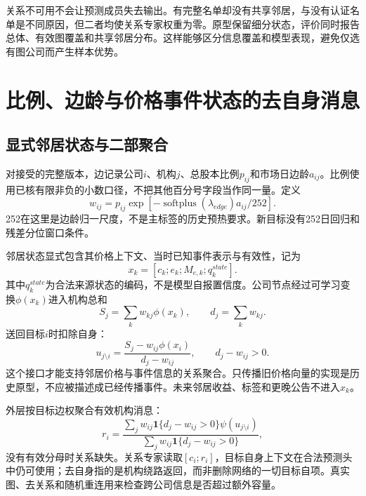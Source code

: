 关系不可用不会让预测成员失去输出。有完整名单却没有共享邻居，与没有认证名单是不同原因，但二者均使关系专家权重为零。原型保留细分状态，评价同时报告总体、有效图覆盖和共享邻居分布。这样能够区分信息覆盖和模型表现，避免仅选有图公司而产生样本优势。

\section{比例、边龄与价格事件状态的去自身消息}
\subsection{显式邻居状态与二部聚合}
对接受的完整版本，边记录公司$i$、机构$j$、总股本比例$p_{ij}$和市场日边龄$a_{ij}$。比例使用已核有限非负的小数口径，不把其他百分号字段当作同一量。定义
\begin{equation}
 w_{ij}=p_{ij}\exp[-\operatorname{softplus}(\lambda_{edge})a_{ij}/252].
\end{equation}
252在这里是边龄归一尺度，不是主标签的历史预热要求。新目标没有252日回归和残差分位窗口条件。

邻居状态显式包含其价格上下文、当时已知事件表示与有效性，记为
\begin{equation}
 x_k=[c_k;e_k;M_{e,k};q_k^{state}].
\end{equation}
其中$q_k^{state}$为合法来源状态的编码，不是模型自报置信度。公司节点经过可学习变换$\phi(x_k)$进入机构总和
\begin{equation}
 S_j=\sum_k w_{kj}\phi(x_k),\qquad d_j=\sum_k w_{kj}.
\end{equation}
送回目标$i$时扣除自身：
\begin{equation}
 u_{j\setminus i}=\frac{S_j-w_{ij}\phi(x_i)}{d_j-w_{ij}},\qquad d_j-w_{ij}>0.
 \label{eq:leaveout}
\end{equation}
这个接口才能支持邻居价格与事件信息的关系聚合。只传播旧价格向量的实现是历史原型，不应被描述成已经传播事件。未来邻居收益、标签和更晚公告不进入$x_k$。


外层按目标边权聚合有效机构消息：
\begin{equation}
 r_i=\frac{\sum_j w_{ij}\mathbf1\{d_j-w_{ij}>0\}\psi(u_{j\setminus i})}
 {\sum_j w_{ij}\mathbf1\{d_j-w_{ij}>0\}},
\end{equation}
没有有效分母时关系缺失。关系专家读取$[c_i;r_i]$，目标自身上下文在合法预测头中仍可使用；去自身指的是机构绕路返回，而非删除网络的一切目标自项。真实图、去关系和随机重连用来检查跨公司信息是否超过额外容量。

